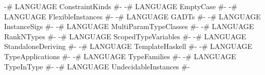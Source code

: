 \begin{code}
{-# LANGUAGE ConstraintKinds       #-}
{-# LANGUAGE EmptyCase             #-}
{-# LANGUAGE FlexibleInstances     #-}
{-# LANGUAGE GADTs                 #-}
{-# LANGUAGE InstanceSigs          #-}
{-# LANGUAGE MultiParamTypeClasses #-}
{-# LANGUAGE RankNTypes            #-}
{-# LANGUAGE ScopedTypeVariables   #-}
{-# LANGUAGE StandaloneDeriving    #-}
{-# LANGUAGE TemplateHaskell       #-}
{-# LANGUAGE TypeApplications      #-}
{-# LANGUAGE TypeFamilies          #-}
{-# LANGUAGE TypeInType            #-}
{-# LANGUAGE UndecidableInstances  #-}
\end{code}
